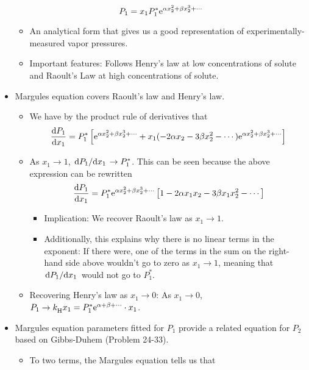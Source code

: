 \documentclass[../notes.tex]{subfiles}
\begin{document}
\begin{itemize}
\begin{equation*}
        P_1 = x_1P_1^*\e[\alpha x_2^2+\beta x_2^3+\cdots]
    \end{equation*}
    \begin{itemize}
        \item An analytical form that gives us a good representation of experimentally-measured vapor pressures.
        \item Important features: Follows Henry's law at low concentrations of solute and Raoult's Law at high concentrations of solute.
    \end{itemize}
    \item Margules equation covers Raoult's law and Henry's law.
    \begin{itemize}
        \item We have by the product rule of derivatives that
        \begin{equation*}
            \dv{P_1}{x_1} = P_1^*\left[ \e[\alpha x_2^2+\beta x_2^3+\cdots]+x_1(-2\alpha x_2-3\beta x_2^2-\cdots)\e[\alpha x_2^2+\beta x_2^3+\cdots] \right]
        \end{equation*}
        \item As $x_1\to 1$, $\dv*{P_1}{x_1}\to P_1^*$. This can be seen because the above expression can be rewritten
        \begin{equation*}
            \dv{P_1}{x_1} = P_1^*\e[\alpha x_2^2+\beta x_2^3+\cdots]\left[ 1-2\alpha x_1x_2-3\beta x_1x_2^2-\cdots \right]
        \end{equation*}
        \begin{itemize}
            \item Implication: We recover Raoult's law as $x_1\to 1$.
            \item Additionally, this explains why there is no linear terms in the exponent: If there were, one of the terms in the sum on the right-hand side above wouldn't go to zero as $x_1\to 1$, meaning that $\dv*{P_1}{x_1}$ would not go to $P_1^*$.
        \end{itemize}
        \item Recovering Henry's law as $x_1\to 0$: As $x_1\to 0$, $P_1\to \kH x_1=P_1^*\e[\alpha+\beta+\cdots]\cdot x_1$.
    \end{itemize}
    \item Margules equation parameters fitted for $P_1$ provide a related equation for $P_2$ based on Gibbs-Duhem (Problem 24-33).
    \begin{itemize}
        \item To two terms, the Margules equation tells us that

\end{itemize}
\end{itemize}
\end{document}
